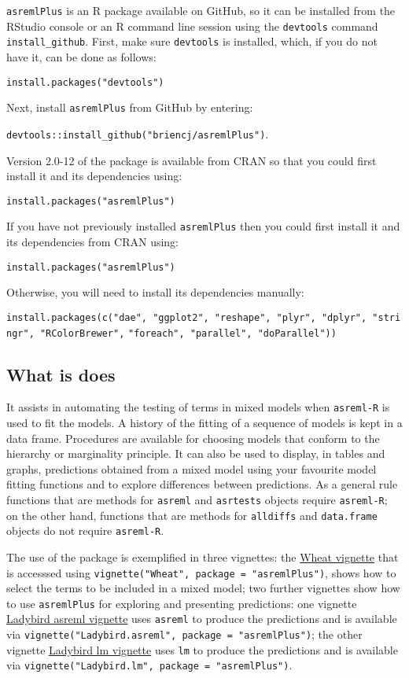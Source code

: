 \documentclass[
]{article}
\begin{document}
\texttt{asremlPlus} is an R package available on GitHub, so it can be
installed from the RStudio console or an R command line session using
the \texttt{devtools} command \texttt{install\_github}. First, make sure
\texttt{devtools} is installed, which, if you do not have it, can be
done as follows:

\texttt{install.packages("devtools")}

Next, install \texttt{asremlPlus} from GitHub by entering:

\texttt{devtools::install\_github("briencj/asremlPlus")}.

Version 2.0-12 of the package is available from CRAN so that you could
first install it and its dependencies using:

\texttt{install.packages("asremlPlus")}

If you have not previously installed \texttt{asremlPlus} then you could
first install it and its dependencies from CRAN using:

\texttt{install.packages("asremlPlus")}

Otherwise, you will need to install its dependencies manually:

\texttt{install.packages(c("dae",\ "ggplot2",\ "reshape",\ "plyr",\ "dplyr",\ "stringr",\ "RColorBrewer",}
\texttt{"foreach",\ "parallel",\ "doParallel"))}

\hypertarget{what-is-does}{%
\subsection{What is does}\label{what-is-does}}

It assists in automating the testing of terms in mixed models when
\texttt{asreml-R} is used to fit the models. A history of the fitting of
a sequence of models is kept in a data frame. Procedures are available
for choosing models that conform to the hierarchy or marginality
principle. It can also be used to display, in tables and graphs,
predictions obtained from a mixed model using your favourite model
fitting functions and to explore differences between predictions. As a
general rule functions that are methods for \texttt{asreml} and
\texttt{asrtests} objects require \texttt{asreml-R}; on the other hand,
functions that are methods for \texttt{alldiffs} and \texttt{data.frame}
objects do not require \texttt{asreml-R}.

The use of the package is exemplified in three vignettes: the
\href{./vignettes/Wheat.pdf}{Wheat vignette} that is accesssed using
\texttt{vignette("Wheat",\ package\ =\ "asremlPlus")}, shows how to
select the terms to be included in a mixed model; two further vignettes
show how to use \texttt{asremlPlus} for exploring and presenting
predictions: one vignette
\href{./vignettes/Ladybird.asreml.pdf}{Ladybird asreml vignette} uses
\texttt{asreml} to produce the predictions and is available via
\texttt{vignette("Ladybird.asreml",\ package\ =\ "asremlPlus")}; the
other vignette \href{./vignettes/Ladybird.asreml.pdf}{Ladybird lm
vignette} uses \texttt{lm} to produce the predictions and is available
via \texttt{vignette("Ladybird.lm",\ package\ =\ "asremlPlus")}.
\end{document}
